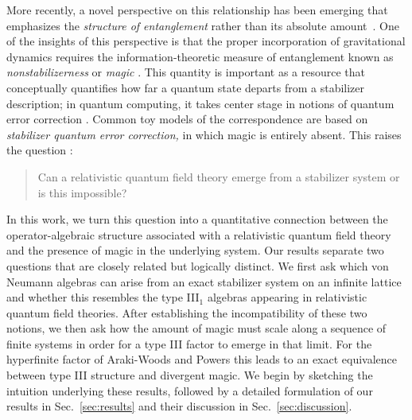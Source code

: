 \documentclass[aps,pra,reprint,superscriptaddress]{revtex4-2}
\theoremstyle{definition}
\theoremstyle{remark}
\begin{document}
More recently, a novel perspective on this relationship has been
emerging that emphasizes the \emph{structure of entanglement} rather than its absolute amount~\cite{cao2024gravitationalbackreactionmagical,Cao:2026uoq,Tirrito:2023fnw,Benedetti:2026mfy,Moosa:2026nqz}. One of the 
insights of this perspective is that the proper incorporation of gravitational dynamics requires the information-theoretic measure of entanglement known as \emph{nonstabilizerness} or \emph{magic}
\cite{Emerson:2013zse,Bravyi:2018ugg}.
This quantity is important 
as a resource that conceptually quantifies how far a quantum state departs from a stabilizer description; in quantum computing, it takes center stage in notions of quantum error correction \cite{Roads}.
Common toy models \cite{Pastawski:2015qua, Jahn2019, Cree2021, AnglesMunne2022, Steinberg2024}
of the correspondence are based on \emph{stabilizer quantum error correction,} in which magic is entirely absent. This raises the question \cite{Pastawski:2015qua}:
\begin{quote}
    Can a relativistic quantum field theory emerge from a stabilizer system or is this impossible?
\end{quote}
In this work, we turn this question 
into a quantitative connection between the operator-algebraic structure associated
with a relativistic quantum field theory
\cite{Fredenhagen1985} and the presence of magic in the underlying system. 
Our results separate two questions that
are closely related but logically distinct. We first ask which von Neumann algebras can arise from
an exact stabilizer system on an infinite lattice and whether this resembles the type III$_1$ algebras appearing in relativistic quantum field theories. After establishing the incompatibility of these two notions, we then ask how the amount
of magic must scale along a sequence of finite systems in order for a type III
factor to emerge in that limit. %
For the hyperfinite factor of Araki-Woods \cite{ArakiWoods1968} and Powers \cite{Powers1967} this leads to an exact equivalence between
type III structure and divergent magic. We begin by sketching the intuition underlying these results, followed by a detailed formulation of our results in Sec.~\ref{sec:results} and their discussion in Sec.~\ref{sec:discussion}.
\end{document}
